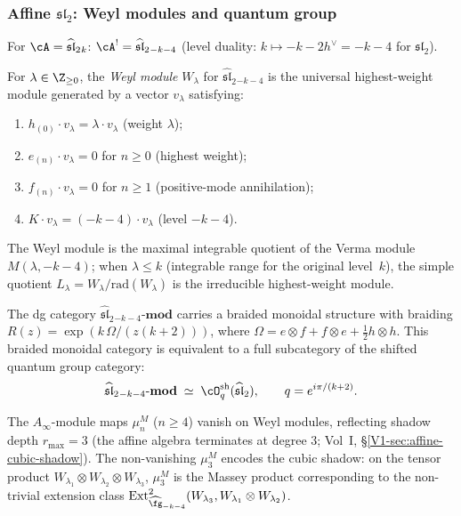 \subsubsection{Affine $\mathfrak{sl}_2$: Weyl modules and quantum group}

For $\cA=\widehat{\mathfrak{sl}}_2{}_k$:
$\cA^!=\widehat{\mathfrak{sl}}_2{}_{-k-4}$
(level duality: $k\mapsto -k-2h^\vee=-k-4$ for
$\mathfrak{sl}_2$).

\begin{definition}
For $\lambda\in\Z_{\ge 0}$, the \emph{Weyl module}
$W_\lambda$ for $\widehat{\mathfrak{sl}}_2{}_{-k-4}$
is the universal highest-weight module generated by a
vector $v_\lambda$ satisfying:
\begin{enumerate}[label=(\roman*)]
\item $h_{(0)}\cdot v_\lambda=\lambda\cdot v_\lambda$
 (weight $\lambda$);
\item $e_{(n)}\cdot v_\lambda=0$ for $n\ge 0$
 (highest weight);
\item $f_{(n)}\cdot v_\lambda=0$ for $n\ge 1$
 (positive-mode annihilation);
\item $K\cdot v_\lambda=(-k-4)\cdot v_\lambda$
 (level $-k-4$).
\end{enumerate}
The Weyl module is the maximal integrable quotient of the
Verma module $M(\lambda,-k-4)$; when $\lambda\le k$
(integrable range for the original level~$k$), the
simple quotient $L_\lambda=W_\lambda/\mathrm{rad}(W_\lambda)$
is the irreducible highest-weight module.
\end{definition}

\begin{proposition}
The dg category
$\widehat{\mathfrak{sl}}_2{}_{-k-4}\text{-}\mathbf{mod}$
carries a braided monoidal structure with braiding
$R(z)=\exp(k\,\Omega/(z(k{+}2)))$, where
$\Omega=e\otimes f+f\otimes e+\tfrac12 h\otimes h$.
This braided monoidal category is equivalent to a
full subcategory of the shifted quantum group category:
\begin{equation}
\widehat{\mathfrak{sl}}_2{}_{-k-4}\text{-}\mathbf{mod}
\;\simeq\;
\cO^{\mathrm{sh}}_q(\widehat{\mathfrak{sl}}_2),
\qquad
q=e^{i\pi/(k+2)}.
\end{equation}

The $A_\infty$-module maps $\mu_n^M$ ($n\ge 4$) vanish
on Weyl modules, reflecting shadow depth $r_{\max}=3$
(the affine algebra terminates at degree $3$;
Vol~I, \S\ref*{V1-sec:affine-cubic-shadow}). The non-vanishing
$\mu_3^M$ encodes the cubic shadow: on the tensor product
$W_{\lambda_1}\otimes W_{\lambda_2}\otimes W_{\lambda_3}$,
$\mu_3^M$ is the Massey product corresponding to the
non-trivial extension class
$\operatorname{Ext}^2_{\widehat{\fg}_{-k-4}}
(W_{\lambda_3},W_{\lambda_1}\otimes W_{\lambda_2})$.
\end{proposition}

